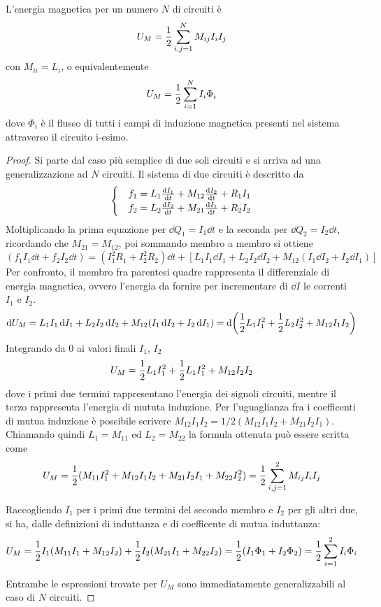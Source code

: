 \begin{thm}
    L'energia magnetica per un numero $N$ di circuiti è
    \begin{equation}
        U_M=\frac{1}{2}\sum_{i,j=1}^N M_{ij}I_iI_j
    \end{equation}
    con $M_{ii}=L_i$, o equivalentemente
    \begin{equation}
        \label{eqn:UM_flussi}
        U_M=\frac{1}{2}\sum_{i=1}^N I_i\Phi_i
    \end{equation}
    dove $\Phi_i$ è il flusso di tutti i campi di induzione magnetica presenti nel sistema attraverso il circuito i-esimo.
\end{thm}
\begin{proof}
    Si parte dal caso più semplice di due soli circuiti e si arriva ad una generalizzazione ad $N$ circuiti.
    Il sistema di due circuiti è descritto da
    \[
        \begin{cases}
            &  f_1=L_1\dv{I_1}{t}+M_{12}\dv{I_2}{t}+R_1I_1 \\
            &  f_2=L_2\dv{I_2}{t}+M_{21}\dv{I_1}{t}+R_2I_2 \\
        \end{cases}
    \]
    Moltiplicando la prima equazione per $\dd{Q_1}=I_1\dd{t}$ e la seconda per $\dd{Q_2}=I_2\dd{t}$,
    ricordando che $M_{21}=M_{12}$, poi sommando membro a membro si ottiene
    \[
        (f_1I_1\dd{t}+f_2I_2\dd{t})=(I_1^2R_1+I_2^2R_2)\dd{t}+[L_1I_1\dd{I_1}+L_2I_2\dd{I_2}+M_{12}(I_1\dd{I_2}+I_2\dd{I_1})]
    \]
    Per confronto, il membro fra parentesi quadre rappresenta il differenziale di energia magnetica, ovvero l'energia da fornire
    per incrementare di $\dd{I}$ le correnti $I_1$ e $I_2$.
    \[
        \dd{U_M}=L_1I_1\dd{I_1}+L_2I_2\dd{I_2}+M_{12}(I_1\dd{I_2}+I_2\dd{I_1})=\dd(\frac{1}{2}L_1I_1^2+\frac{1}{2}L_2I_2^2+M_{12}I_1I_2)
    \]
    Integrando da $0$ ai valori finali $I_1$, $I_2$
    \[
        U_M=\frac{1}{2}L_1I_1^2+\frac{1}{2}L_1I_1^2+M_{12}I_2I_2
    \]
    dove i primi due termini rappresentano l'energia dei signoli circuiti, mentre il terzo rappresenta l'energia di mututa induzione.
    Per l'uguaglianza fra i coefficenti di mutua induzione è possibile scrivere $M_{12}I_1I_2=1/2(M_{12}I_1I_2+M_{21}I_2I_1)$.
    Chiamando quindi $L_1=M_{11}$ ed $L_2=M_{22}$ la formula ottenuta può essere scritta come
    \[
        U_M=\frac{1}{2}(M_{11}I_1^2+M_{12}I_1I_2+M_{21}I_2I_1+M_{22}I_2^2)=\frac{1}{2}\sum_{i,j=1}^2M_{ij}I_iI_j
    \]

    Raccogliendo $I_1$ per i primi due termini del secondo membro e $I_2$ per gli altri due, si ha,
    dalle definizioni di induttanza e di coefficente di mutua induttanza:
    \[
        U_M=\frac{1}{2}I_1(M_{11}I_1+M_{12}I_2)+\frac{1}{2}I_2(M_{21}I_1+M_{22}I_2)=\frac{1}{2}(I_1\Phi_1+I_2\Phi_2)=\frac{1}{2}\sum_{i=1}^2I_i\Phi_i
    \]

    Entrambe le espressioni trovate per $U_M$ sono immediatamente generalizzabili al caso di $N$ circuiti.
\end{proof}


